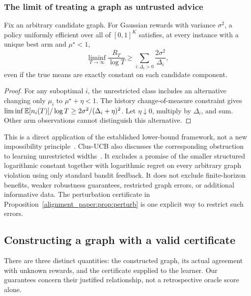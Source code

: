 \subsubsection{The limit of treating a graph as untrusted advice}
\begin{proposition}
Fix an arbitrary candidate graph. For Gaussian rewards with variance $\sigma^2$, a policy uniformly efficient over all of $[0,1]^K$ satisfies, at every instance with a unique best arm and $\mu^\star<1$,
\begin{equation}
 \liminf_{T\to\infty}\frac{R_T}{\log T}
       \ge\sum_{i:\Delta_i>0}\frac{2\sigma^2}{\Delta_i},
 \label{alignment_paper:eq:untrustedlower}
\end{equation}
even if the true means are exactly constant on each candidate component.
\label{alignment_paper:prop:untrusted}
\end{proposition}
\begin{proof}
For any suboptimal $i$, the unrestricted class includes an alternative changing only $\mu_i$ to $\mu^\star+\eta<1$. The history change-of-measure constraint gives
$\liminf\mathbb E[n_i(T)]/\log T\ge2\sigma^2/(\Delta_i+\eta)^2$.
Let $\eta\downarrow0$, multiply by $\Delta_i$, and sum. Other arm observations cannot distinguish this alternative.
\end{proof}
This is a direct application of the established lower-bound framework, not a new impossibility principle~\cite{collected11,collected22}. Clus-UCB also discusses the corresponding obstruction to learning unrestricted widths~\cite{collected19}. It excludes a promise of the smaller structured logarithmic constant together with logarithmic regret on every arbitrary graph violation using only standard bandit feedback. It does not exclude finite-horizon benefits, weaker robustness guarantees, restricted graph errors, or additional informative data. The perturbation certificate in Proposition~\ref{alignment_paper:prop:perturb} is one explicit way to restrict such errors.



\subsection{Constructing a graph with a valid certificate}
There are three distinct quantities: the constructed graph, its actual agreement with unknown rewards, and the certificate supplied to the learner. Our guarantees concern their justified relationship, not a retrospective oracle score alone.

